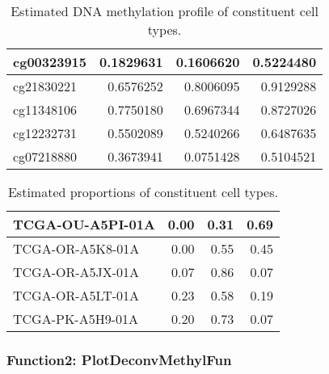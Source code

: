 \documentclass[]{article}
\newcommand{\hlnum}[1]{\textcolor[rgb]{0.816,0.125,0.439}{#1}}%
\newcommand{\hlstr}[1]{\textcolor[rgb]{0.251,0.627,0.251}{#1}}%
\newcommand{\hlstd}[1]{\textcolor[rgb]{0.251,0.251,0.251}{#1}}%
\newenvironment{Shaded}{\begin{myshaded}}{\end{myshaded}}
\newcommand{\DecValTok}[1]{\hlnum{#1}}
\newcommand{\SpecialCharTok}[1]{\hlstr{#1}}
\newcommand{\StringTok}[1]{\hlstr{#1}}
\newcommand{\FunctionTok}[1]{\hlstd{#1}}
\newcommand{\AttributeTok}[1]{{#1}}
\newcommand{\NormalTok}[1]{\hlstd{#1}}
\begin{document}
\begin{table}

\caption{\label{tab:unnamed-chunk-71}Estimated DNA methylation profile of constituent cell types.}
\centering
\begin{tabular}[t]{l|r|r|r}
\hline
cg00323915 & 0.1829631 & 0.1606620 & 0.5224480\\
\hline
cg21830221 & 0.6576252 & 0.8006095 & 0.9129288\\
\hline
cg11348106 & 0.7750180 & 0.6967344 & 0.8727026\\
\hline
cg12232731 & 0.5502089 & 0.5240266 & 0.6487635\\
\hline
cg07218880 & 0.3673941 & 0.0751428 & 0.5104521\\
\hline
\end{tabular}
\end{table}

\begin{Shaded}
\end{Shaded}

\begin{table}

\caption{\label{tab:unnamed-chunk-71}Estimated proportions of constituent cell types.}
\centering
\begin{tabular}[t]{l|r|r|r}
\hline
TCGA-OU-A5PI-01A & 0.00 & 0.31 & 0.69\\
\hline
TCGA-OR-A5K8-01A & 0.00 & 0.55 & 0.45\\
\hline
TCGA-OR-A5JX-01A & 0.07 & 0.86 & 0.07\\
\hline
TCGA-OR-A5LT-01A & 0.23 & 0.58 & 0.19\\
\hline
TCGA-PK-A5H9-01A & 0.20 & 0.73 & 0.07\\
\hline
\end{tabular}
\end{table}

\hypertarget{function2-plotdeconvmethylfun}{%
\subsubsection{\texorpdfstring{ Function2: PlotDeconvMethylFun}{  Function2: PlotDeconvMethylFun}}\label{function2-plotdeconvmethylfun}}
\end{document}
